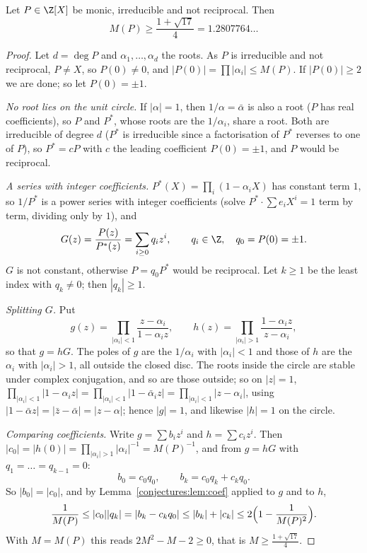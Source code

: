 \begin{theorem}\label{conjectures:thm:smyth}
Let $P\in\Z[X]$ be monic, irreducible and not reciprocal. Then
\[
M(P)\ge\frac{1+\sqrt{17}}4=1.2807764\ldots
\]
\end{theorem}
\begin{proof}
Let $d=\deg P$ and $\alpha_1,\dots,\alpha_d$ the roots. As $P$ is irreducible and not reciprocal, $P\ne X$, so $P(0)\ne0$, and $|P(0)|=\prod|\alpha_i|\le
M(P)$. If $|P(0)|\ge2$ we are done; so let $P(0)=\pm1$.

\emph{No root lies on the unit circle.} If $|\alpha|=1$, then $1/\alpha=\bar\alpha$ is also a root ($P$ has real coefficients), so $P$ and $P^*$, whose roots are
the $1/\alpha_i$, share a root. Both are irreducible of degree $d$ ($P^*$ is irreducible since a factorisation of $P^*$ reverses to one of $P$), so
$P^*=cP$ with $c$ the leading coefficient $P(0)=\pm1$, and $P$ would be reciprocal.

\emph{A series with integer coefficients.} $P^*(X)=\prod_i(1-\alpha_iX)$ has constant term $1$, so $1/P^*$ is a power series with integer coefficients
(solve $P^*\cdot\sum e_iX^i=1$ term by term, dividing only by $1$), and
\[
G(z)=\frac{P(z)}{P^*(z)}=\sum_{i\ge0}q_iz^i,\qquad q_i\in\Z,\quad q_0=P(0)=\pm1.
\]
$G$ is not constant, otherwise $P=q_0P^*$ would be reciprocal. Let $k\ge1$ be the least index with $q_k\ne0$; then $|q_k|\ge1$.

\emph{Splitting $G$.} Put
\[
g(z)=\prod_{|\alpha_i|<1}\frac{z-\alpha_i}{1-\alpha_iz},\qquad h(z)=\prod_{|\alpha_i|>1}\frac{1-\alpha_iz}{z-\alpha_i},
\]
so that $g=hG$. The poles of $g$ are the $1/\alpha_i$ with $|\alpha_i|<1$ and those of $h$ are the $\alpha_i$ with $|\alpha_i|>1$, all outside the closed
disc. The roots inside the circle are stable under complex conjugation, and so are those outside; so on $|z|=1$,
$\prod_{|\alpha_i|<1}|1-\alpha_iz|=\prod_{|\alpha_i|<1}|1-\bar\alpha_iz|=\prod_{|\alpha_i|<1}|z-\alpha_i|$, using $|1-\bar\alpha z|=|\bar z-\bar\alpha|=
|z-\alpha|$; hence $|g|=1$, and likewise $|h|=1$ on the circle.

\emph{Comparing coefficients.} Write $g=\sum b_iz^i$ and $h=\sum c_iz^i$. Then $|c_0|=|h(0)|=\prod_{|\alpha_i|>1}|\alpha_i|^{-1}=M(P)^{-1}$, and from
$g=hG$ with $q_1=\dots=q_{k-1}=0$:
\[
b_0=c_0q_0,\qquad b_k=c_0q_k+c_kq_0.
\]
So $|b_0|=|c_0|$, and by Lemma~\ref{conjectures:lem:coef} applied to $g$ and to $h$,
\[
\frac1{M(P)}\le|c_0||q_k|=|b_k-c_kq_0|\le|b_k|+|c_k|\le2\Bigl(1-\frac1{M(P)^2}\Bigr).
\]
With $M=M(P)$ this reads $2M^2-M-2\ge0$, that is $M\ge\frac{1+\sqrt{17}}4$.
\end{proof}

